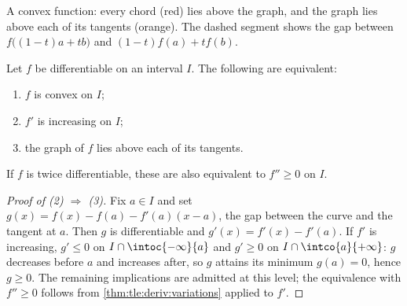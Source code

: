 \begin{omfigure}

{\small A convex function: every chord (red) lies above the graph, and
the graph lies above each of its tangents (orange). The dashed segment
shows the gap between $f\bigl((1-t)a+tb\bigr)$ and $(1-t)f(a)+tf(b)$.}
\end{omfigure}

\begin{theorem}\label{thm:tle:deriv:convexity}
Let $f$ be differentiable on an interval $I$. The following are equivalent:
\begin{enumerate}
  \item $f$ is convex on $I$;
  \item $f'$ is increasing on $I$;
  \item the graph of $f$ lies above each of its tangents.
\end{enumerate}
If $f$ is twice differentiable, these are also equivalent to $f'' \geq 0$ on
$I$.
\end{theorem}

\begin{proof}[Proof of (2) $\Rightarrow$ (3)]
Fix $a \in I$ and set
$g(x) = f(x) - f(a) - f'(a)(x-a)$, the gap between the curve and the tangent
at $a$. Then $g$ is differentiable and $g'(x) = f'(x) - f'(a)$. If $f'$ is
increasing, $g' \leq 0$ on $I \cap \intoc{-\infty}{a}$ and $g' \geq 0$ on
$I \cap \intco{a}{+\infty}$: $g$ decreases before $a$ and increases after,
so $g$ attains its minimum $g(a) = 0$, hence $g \geq 0$.
The remaining implications are admitted at this level; the equivalence with
$f'' \geq 0$ follows from \cref{thm:tle:deriv:variations} applied to $f'$.
\end{proof}

